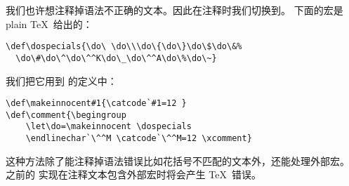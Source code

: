 \documentclass{book}
\begin{document}
我们也许想注释掉语法不正确的文本。因此在注释时我们切换到。
下面的宏是 plain \TeX\ 给出的：
\begin{verbatim}
\def\dospecials{\do\ \do\\\do\{\do\}\do\$\do\&%
  \do\#\do\^\do\^^K\do\_\do\^^A\do\%\do\~}
\end{verbatim}
我们把它用到  的定义中：
\begin{verbatim}
\def\makeinnocent#1{\catcode`#1=12 }
\def\comment{\begingroup
    \let\do=\makeinnocent \dospecials
    \endlinechar`\^^M \catcode`\^^M=12 \xcomment}
\end{verbatim}
这种方法除了能注释掉语法错误比如花括号不匹配的文本外，还能处理外部宏。
之前的  实现在注释文本包含外部宏时将会产生 \TeX\ 错误。
\end{document}

